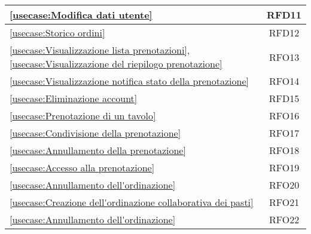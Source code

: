 \begin{longtable}{|l|c|}
	\hline
	\autoref{usecase:Modifica dati utente}                                                                                                                       & RFD11                  \\
	\hline
	\autoref{usecase:Storico ordini}                                                                                                                             & RFD12                  \\
	\hline
	\autoref{usecase:Visualizzazione lista prenotazioni}, \autoref{usecase:Visualizzazione del riepilogo prenotazione}                                           & RFO13                  \\
	\hline
	\autoref{usecase:Visualizzazione notifica stato della prenotazione}                                                                                          & RFO14                  \\
	\hline
	\autoref{usecase:Eliminazione account}                                                                                                                       & RFD15                  \\
	\hline
	\autoref{usecase:Prenotazione di un tavolo}                                                                                                                  & RFO16                  \\
	\hline
	\autoref{usecase:Condivisione della prenotazione}                                                                                                            & RFO17                  \\
	\hline
	\autoref{usecase:Annullamento della prenotazione}                                                                                                            & RFO18                  \\
	\hline
	\autoref{usecase:Accesso alla prenotazione}                                                                                                                  & RFO19                  \\
	\hline
	\autoref{usecase:Annullamento dell'ordinazione}                                                                                                              & RFO20                  \\
	\hline
	\autoref{usecase:Creazione dell'ordinazione collaborativa dei pasti}                                                                                         & RFO21                  \\
	\hline
	\autoref{usecase:Annullamento dell'ordinazione}                                                                                                              & RFO22                  \\

\end{longtable}
